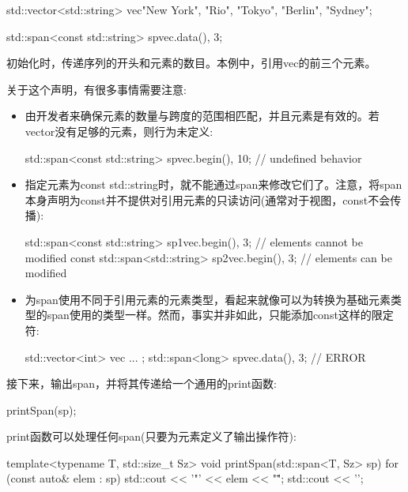 \begin{cpp}
std::vector<std::string> vec{"New York", "Rio", "Tokyo", "Berlin", "Sydney"};

std::span<const std::string> sp{vec.data(), 3};
\end{cpp}

初始化时，传递序列的开头和元素的数目。本例中，引用vec的前三个元素。

关于这个声明，有很多事情需要注意:

\begin{itemize}
\item
由开发者来确保元素的数量与跨度的范围相匹配，并且元素是有效的。若vector没有足够的元素，则行为未定义:

\begin{cpp}
std::span<const std::string> sp{vec.begin(), 10}; // undefined behavior
\end{cpp}

\item
指定元素为const std::string时，就不能通过span来修改它们了。注意，将span本身声明为const并不提供对引用元素的只读访问(通常对于视图，const不会传播):

\begin{cpp}
std::span<const std::string> sp1{vec.begin(), 3}; // elements cannot be modified
const std::span<std::string> sp2{vec.begin(), 3}; // elements can be modified
\end{cpp}

\item
为span使用不同于引用元素的元素类型，看起来就像可以为转换为基础元素类型的span使用的类型一样。然而，事实并非如此，只能添加const这样的限定符:

\begin{cpp}
std::vector<int> vec{ ... };
std::span<long> sp{vec.data(), 3}; // ERROR
\end{cpp}
\end{itemize}


接下来，输出span，并将其传递给一个通用的print函数:

\begin{cpp}
printSpan(sp);
\end{cpp}

print函数可以处理任何span(只要为元素定义了输出操作符):

\begin{cpp}
template<typename T, std::size_t Sz>
void printSpan(std::span<T, Sz> sp)
{
	for (const auto& elem : sp) {
		std::cout << '"' << elem << "\" ";
	}
	std::cout << '\n';
}
\end{cpp}

